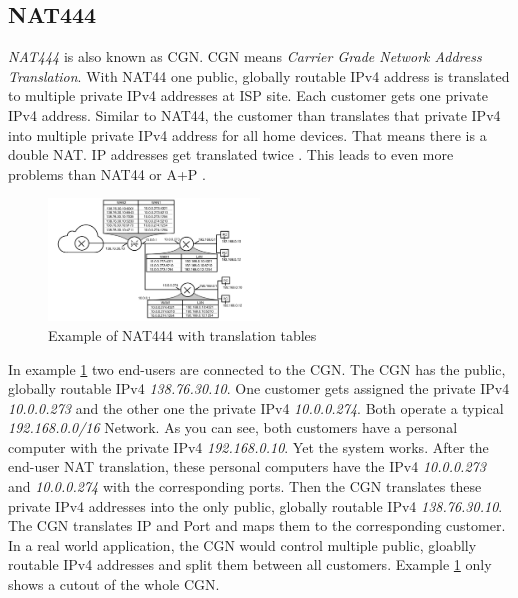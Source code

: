 \documentclass[format=sigconf, natbib=true, nonacm=true]{acmart}
\begin{document}
    \subsection{NAT444}
    \textit{NAT444} is also known as CGN. CGN means \textit{Carrier Grade Network Address Translation}. With NAT44 one public, globally routable IPv4 address is translated to multiple private IPv4 addresses at ISP site. Each customer gets one private IPv4 address. Similar to NAT44, the customer than translates that private IPv4 into multiple private IPv4 address for all home devices. That means there is a double NAT. IP addresses get translated twice \cite{10.1145/2987443.2987474}. This leads to even more problems than NAT44 or A+P \cite{8716482}.
    \begin{figure}
        \centering
        \includegraphics[width=0.5\textwidth]{images/nat_444.png}
        \caption{Example of NAT444 with translation tables}
        \label{fig:nat_444}
    \end{figure}
    In example \ref{fig:nat_444} two end-users are connected to the CGN. The CGN has the public, globally routable IPv4 \textit{138.76.30.10}. One customer gets assigned the private IPv4 \textit{10.0.0.273} and the other one the private IPv4 \textit{10.0.0.274}. Both operate a typical \textit{192.168.0.0/16} Network. As you can see, both customers have a personal computer with the private IPv4 \textit{192.168.0.10}. Yet the system works. After the end-user NAT translation, these personal computers have the IPv4 \textit{10.0.0.273} and \textit{10.0.0.274} with the corresponding ports. Then the CGN translates these private IPv4 addresses into the only public, globally routable IPv4 \textit{138.76.30.10}. The CGN translates IP and Port and maps them to the corresponding customer. In a real world application, the CGN would control multiple public, gloablly routable IPv4 addresses and split them between all customers. Example \ref{fig:nat_444} only shows a cutout of the whole CGN\cite{Hughes2022_C11}.
\end{document}
